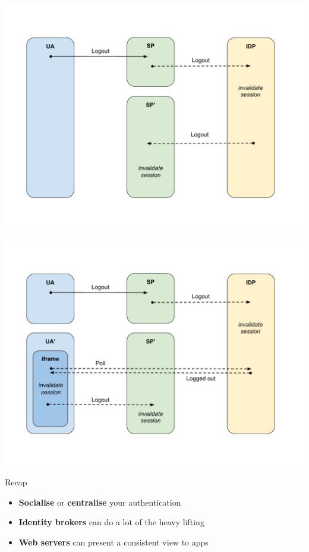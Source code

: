 \documentclass[ignorenonframetext,aspectratio=169]{beamer}
\providecommand{\tightlist}{%
  \setlength{\itemsep}{0pt}\setlength{\parskip}{0pt}}
\begin{document}
\begin{frame}[plain]
\centering
\includegraphics[height=\paperheight]{fedsso-logout-backchannel.pdf}
\end{frame}

\begin{frame}[plain]
\centering
\includegraphics[height=\paperheight]{fedsso-logout-frontchannel.pdf}
\end{frame}

\begin{frame}{Recap}

\begin{itemize}
\tightlist
\item {\bf Socialise} or {\bf centralise} your authentication
\item \textbf{Identity brokers} can do a lot of the heavy lifting
\item \textbf{Web servers} can present a consistent view to apps
\end{itemize}

\end{frame}
\end{document}
